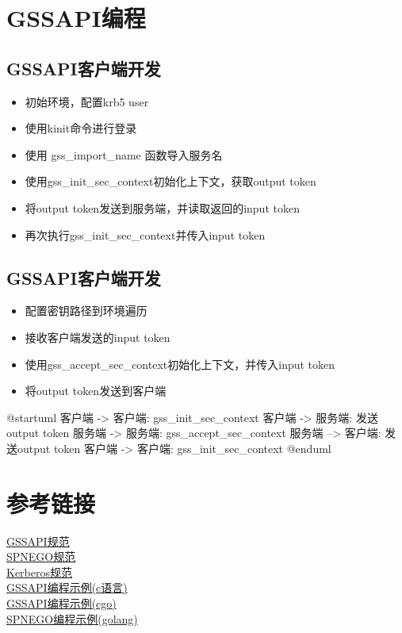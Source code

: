 \documentclass[a4paper]{scrartcl}
\begin{document}
\section{GSSAPI编程}
\subsection{GSSAPI客户端开发}

\begin{itemize}
    \item 初始环境，配置krb5 user
    \item 使用kinit命令进行登录
    \item 使用 gss\_import\_name 函数导入服务名
    \item 使用gss\_init\_sec\_context初始化上下文，获取output token
    \item 将output token发送到服务端，并读取返回的input token
    \item 再次执行gss\_init\_sec\_context并传入input token
\end{itemize}

\subsection{GSSAPI客户端开发}
\begin{itemize}
    \item 配置密钥路径到环境遍历
    \item 接收客户端发送的input token
    \item 使用gss\_accept\_sec\_context初始化上下文，并传入input token
    \item 将output token发送到客户端
\end{itemize}
\begin{plantuml}
    @startuml
    客户端 -> 客户端: gss_init_sec_context
    客户端 -> 服务端: 发送output token
    服务端 -> 服务端: gss_accept_sec_context
    服务端 --> 客户端: 发送output token
    客户端 -> 客户端: gss_init_sec_context
    @enduml
\end{plantuml}
\clearpage
\section{参考链接}
\href{https://tools.ietf.org/html/rfc2743}{GSSAPI规范}
\\
\href{https://tools.ietf.org/html/rfc4178}{SPNEGO规范}
\\
\href{https://tools.ietf.org/html/rfc4121}{Kerberos规范}
\\
\href{https://github.com/pbrezina/gssapi-auth}{GSSAPI编程示例(c语言)}
\\
\href{https://github.com/myml/gssapi-example}{GSSAPI编程示例(cgo)}
\\
\href{https://github.com/myml/gssapi-example}{SPNEGO编程示例(golang)}
\clearpage
\end{document}
